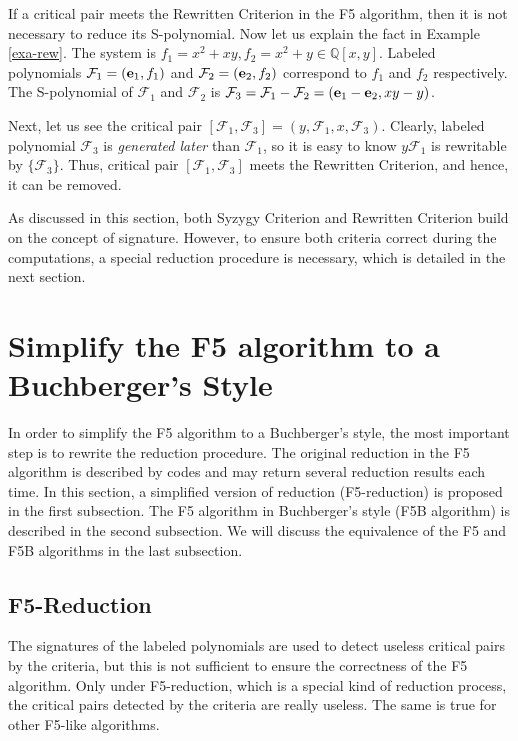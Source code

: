 \documentclass[preprint,authoryear,3p,12pt]{elsarticle}
\def\eb{{\bf e}}
\def\Q{{\mathbb{Q}}}
\begin{document}
If a critical pair meets the Rewritten Criterion in the F5 algorithm, then it is not necessary to reduce its S-polynomial. Now
let us explain the fact in Example \ref{exa-rew}. The system is $f_1=x^2+xy, f_2=x^2+y\in \Q[x, y]$. Labeled polynomials
${\mathcal F}_1=(\eb_1, f_1)$ and ${\mathcal F}_2=(\eb_2, f_2)$ correspond to $f_1$ and $f_2$ respectively. The S-polynomial of
${\mathcal F}_1$ and ${\mathcal F}_2$ is ${\mathcal F}_3={\mathcal F}_1-{\mathcal F}_2=(\eb_1-\eb_2, xy-y)$.

Next, let us see the critical pair $[{\mathcal F}_1, {\mathcal F}_3]=(y, {\mathcal F}_1, x, {\mathcal F}_3)$. Clearly, labeled
polynomial ${\mathcal F}_3$ is {\em generated later} than ${\mathcal F}_1$, so it is easy to know $y{\mathcal F}_1$ is rewritable
by $\{{\mathcal F}_3\}$. Thus, critical pair $[{\mathcal F}_1, {\mathcal F}_3]$ meets the Rewritten Criterion, and hence, it can
be removed.

As discussed in this section, both Syzygy Criterion and Rewritten Criterion build on the concept of signature. However, to ensure
both criteria correct during the computations, a special reduction procedure is necessary, which is detailed in the next section.




\section{Simplify the F5 algorithm to a Buchberger's Style} \label{sec-F5B}


In order to simplify the F5 algorithm to a Buchberger's style, the most important step is to rewrite the reduction procedure. The
original reduction in the F5 algorithm is described by codes and may return several reduction results each time. In this section,
a simplified version of reduction (F5-reduction) is proposed in the first subsection. The F5 algorithm in Buchberger's style (F5B
algorithm) is described in the second subsection. We will discuss the equivalence of the F5 and F5B algorithms in the last
subsection.



\subsection{F5-Reduction}  \label{subsec-reduce}

The signatures of the labeled polynomials are used to detect   useless critical pairs by the criteria, but this is not sufficient
to ensure the correctness of the F5 algorithm. Only under F5-reduction, which is a special kind of reduction process, the
critical pairs detected by the criteria are really useless. The same is true for other F5-like algorithms.
\end{document}
